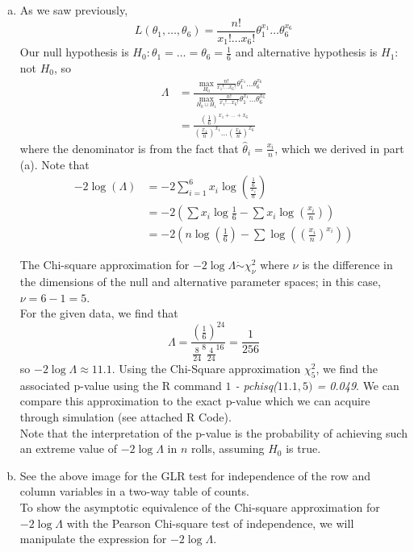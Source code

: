 \begin{enumerate}[a)]
    \item As we saw previously, 
    \[
        L(\theta_1, \dots, \theta_6) = \frac{n!}{x_1! \dots x_6!}\theta_1^{x_1} \dots \theta_6^{x_6}
    \]
    Our null hypothesis is $H_0\colon \theta_1 = \dots = \theta_6 = \frac{1}{6}$ and alternative hypothesis is $H_1\colon $ not $H_0$, so
    \begin{align*}
        \Lambda &= \frac{\max\limits_{H_0} \frac{n!}{x_1! \dots x_6!}\theta_1^{x_1} \dots \theta_6^{x_6}}{\max\limits_{H_0 \cup H_1} \frac{n!}{x_1! \dots x_6!}\theta_1^{x_1} \dots \theta_6^{x_6}} \\
        &= \frac{\left( \frac{1}{6} \right)^{x_1 + \dots + x_6} }{\left( \frac{x_1}{n} \right)^{x_1} \dots \left( \frac{x_6}{n} \right)^{x_6} }
    \end{align*}
    where the denominator is from the fact that $\hat{\theta}_i = \frac{x_i}{n}$, which we derived in part (a). Note that
    \begin{align*}
        -2 \log (\Lambda) &= -2 \sum_{i=1}^6 x_i \log \left( \frac{\frac{1}{6}}{\frac{x_i}{n}} \right) \\
        &= -2 \left( \sum x_i \log \frac{1}{6} - \sum x_i \log \left( \frac{x_i}{n} \right) \right) \\
        &= -2 \left( n \log \left(\frac{1}{6}\right) - \sum \log \left( \left( \frac{x_i}{n} \right)^{x_i} \right) \right) 
    \end{align*}

    The Chi-square approximation for $-2 \log \Lambda \dot\sim \chi^2_{\nu}$ where $\nu$ is the difference in the dimensions of the null and alternative parameter spaces; in this case, $\nu = 6 - 1 = 5$. \\

    For the given data, we find that 
    \[
        \Lambda = \frac{\left( \frac{1}{6} \right)^{24} }{\frac{8}{24}^8 \frac{4}{24}^{16}} = \frac{1}{256}
    \]
    so $-2 \log \Lambda \approx 11.1$. Using the Chi-Square approximation $\chi^2_5$, we find the associated p-value using the R command \textit{$1$ - pchisq($11.1, 5)$ = 0.049}.
    We can compare this approximation to the exact p-value which we can acquire through simulation (see attached R Code). \\

    Note that the interpretation of the p-value is the probability of achieving such an extreme value of $-2\log \Lambda$ in $n$ rolls, assuming $H_0$ is true.

    \item See the above image for the GLR test for independence of the row and column variables in a two-way table of counts.\\
    
    To show the asymptotic equivalence of the Chi-square approximation for $-2 \log \Lambda$ with the Pearson Chi-square test of independence, we will manipulate the expression for $-2 \log \Lambda$. \\

    
\end{enumerate}